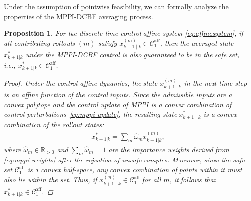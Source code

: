\documentclass[letterpaper, 10 pt, conference]{ieeeconf}
\newtheorem{proposition}{Proposition}
\begin{document}
Under the assumption of pointwise feasibility, we can formally analyze the properties of the MPPI-DCBF averaging process.

\begin{proposition} \label{prop: 1}
    For the discrete-time control affine system \eqref{eq:affinesystem}, if all contributing rollouts $(m)$ satisfy $x^{(m)}_{k+1\mid k} \in \mathcal{C}_1^{\mathrm{aff}}$, then the averaged state $x^*_{k+1|k}$ under the MPPI-DCBF control is also guaranteed to be in the safe set, \textit{i.e.,} $x^*_{k+1|k} \in \mathcal{C}_1^{\mathrm{aff}}$.
    
    \begin{proof}
    Under the control affine dynamics, the state $x^{(m)}_{k+1\mid k}$ in the next time step is an affine function of the control inputs. Since the admissible inputs are a convex polytope and the control update of MPPI is a convex combination of control perturbations~\eqref{eq:mppi-update}, the resulting state $x^*_{k+1\mid k}$ is a convex combination of the rollout states:
    \begin{align}
    x^*_{k+1|k} = \sum_m \hat{\omega}_m x^{(m)}_{k+1|k}, \nonumber
    \end{align}
    where $\hat{\omega}_m \in \mathbb{R}_{> 0}$ and $\sum_m \hat{\omega}_m = 1$ are the importance weights derived from \eqref{eq:mppi-weights} after the rejection of unsafe samples. Moreover, since the safe set $\mathcal{C}_1^{\mathrm{aff}}$ is a convex half-space, any convex combination of points within it must also lie within the set. Thus, if $x^{(m)}_{k+1\mid k} \in \mathcal{C}_1^{\mathrm{aff}}$ for all $m$, it follows that $x^*_{k+1|k} \in \mathcal{C}_1^{\mathrm{aff}}$.
    \end{proof}
\end{proposition}
\end{document}
